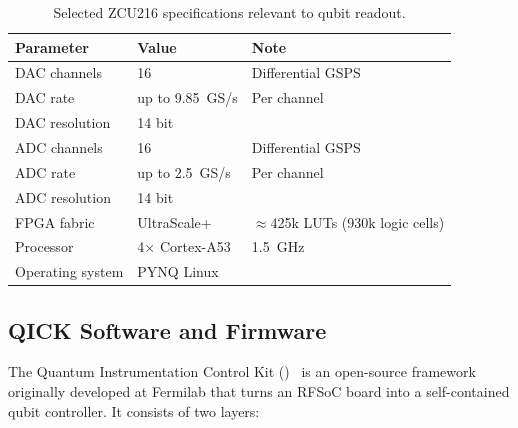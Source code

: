 \begin{table}[ht]
      \centering
      \caption{Selected ZCU216 specifications relevant to qubit readout.}
      \label{tab:zcu216}
      \begin{tabular}{lll}
            \toprule
            Parameter        & Value                 & Note              \\
            \midrule
            DAC channels     & 16                    & Differential GSPS \\
            DAC rate         & up to \SI{9.85}{GS/s} & Per channel       \\
            DAC resolution   & 14 bit                &                   \\
            ADC channels     & 16                    & Differential GSPS \\
            ADC rate         & up to \SI{2.5}{GS/s}  & Per channel       \\
            ADC resolution   & 14 bit                &                   \\
            FPGA fabric      & UltraScale+           & $\approx$425k LUTs (930k logic cells) \\
            Processor        & 4$\times$ Cortex-A53  & \SI{1.5}{GHz}     \\
            Operating system & PYNQ Linux            &                   \\
            \bottomrule
      \end{tabular}
\end{table}

\subsection{QICK Software and Firmware}
\label{subsec:qick_stack}

The Quantum Instrumentation Control Kit (\QICK)~\cite{Stefanazzi2022,QICK_github} is an
open-source framework originally developed at Fermilab that turns an RFSoC board
into a self-contained qubit controller.  It consists of two layers:

